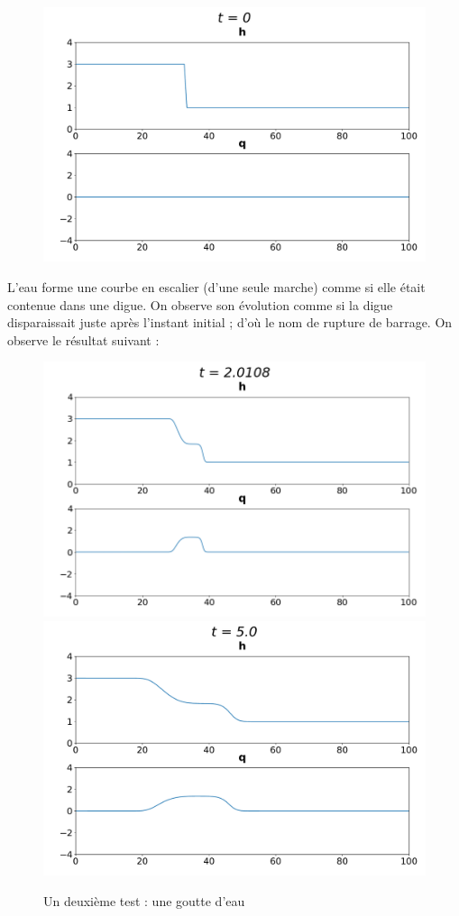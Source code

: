 \documentclass[
11pt, %
francais, %
singlespacing, %
headsepline, %
]{MastersDoctoralThesis} %
\begin{document}
\begin{figure}
\centering
\includegraphics[scale = .7]{"barrage0"}
\end{figure}

L'eau forme une courbe en escalier (d'une seule marche) comme si elle était contenue dans une digue. On observe son évolution comme si la digue disparaissait juste après l'instant initial ; d'où le nom de
rupture de barrage. On observe le résultat suivant :

\begin{figure}
\includegraphics[scale = .6]{"barrage1"}
\includegraphics[scale = .6]{"barrage5"} 
\caption{Un deuxième test : une goutte d'eau}
\end{figure}
\end{document}
